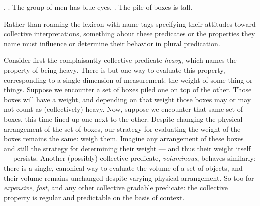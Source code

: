\documentclass[linguex]{sp}
\begin{document}
\ex. \a. The group of men has blue eyes. 
\b. The pile of boxes is tall.

Rather than roaming the lexicon with name tags specifying their attitudes toward collective interpretations, something about these predicates or the properties they name must influence or determine their behavior in plural predication.


Consider first the complaisantly collective predicate \emph{heavy}, which names the property of being heavy. There is but one way to evaluate this property, corresponding to a single dimension of measurement: the weight of some thing or things. Suppose we encounter a set of boxes piled one on top of the other. Those boxes will have a weight, and depending on that weight those boxes may or may not count as (collectively) heavy. Now, suppose we encounter that same set of boxes, this time lined up one next to the other. Despite changing the physical arrangement of the set of boxes, our strategy for evaluating the weight of the boxes remains the same: weigh them. Imagine any arrangement of these boxes and still the strategy for determining their weight --- and thus their weight itself --- persists. Another (possibly) collective predicate, \emph{voluminous}, behaves similarly: there is a single, canonical way to evaluate the volume of a set of objects, and their volume remains unchanged despite varying physical arrangement. So too for \emph{expensive}, \emph{fast}, and any other  collective gradable predicate: the collective property is regular and predictable on the basis of context.
\end{document}
